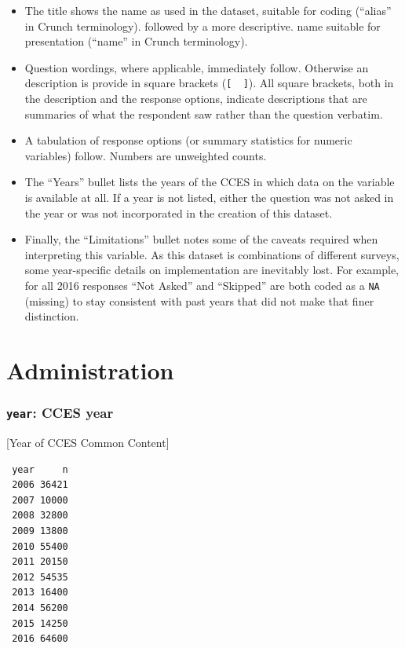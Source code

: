 \documentclass[10pt,article,oneside]{memoir}
\theoremstyle{definition}
\begin{document}
\begin{itemize}
\tightlist
\item
  The title shows the name as used in the dataset, suitable for coding
  (``alias'' in Crunch terminology). followed by a more descriptive.
  name suitable for presentation (``name'' in Crunch terminology).
\item
  Question wordings, where applicable, immediately follow. Otherwise an
  description is provide in square brackets (\texttt{{[}\ \ {]}}). All
  square brackets, both in the description and the response options,
  indicate descriptions that are summaries of what the respondent saw
  rather than the question verbatim.
\item
  A tabulation of response options (or summary statistics for numeric
  variables) follow. Numbers are unweighted counts.
\item
  The ``Years'' bullet lists the years of the CCES in which data on the
  variable is available at all. If a year is not listed, either the
  question was not asked in the year or was not incorporated in the
  creation of this dataset.
\item
  Finally, the ``Limitations'' bullet notes some of the caveats required
  when interpreting this variable. As this dataset is combinations of
  different surveys, some year-specific details on implementation are
  inevitably lost. For example, for all 2016 responses ``Not Asked'' and
  ``Skipped'' are both coded as a \texttt{NA} (missing) to stay
  consistent with past years that did not make that finer distinction.
\end{itemize}

\section{Administration}\label{administration}

\subsubsection{\texorpdfstring{\texttt{year}: CCES
year}{year: CCES year}}\label{year-cces-year}

{[}Year of CCES Common Content{]}

\begin{verbatim}
 year     n
 2006 36421
 2007 10000
 2008 32800
 2009 13800
 2010 55400
 2011 20150
 2012 54535
 2013 16400
 2014 56200
 2015 14250
 2016 64600
\end{verbatim}
\end{document}
